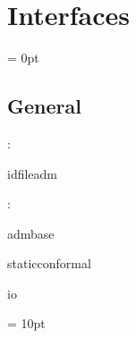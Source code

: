 
\section{Interfaces} 


\parskip = 0pt

\vspace{3mm} \subsection*{General}

: 

idfileadm
\vspace{2mm}

: 

admbase

staticconformal

io
\vspace{2mm}

\vspace{5mm}\parskip = 10pt 
